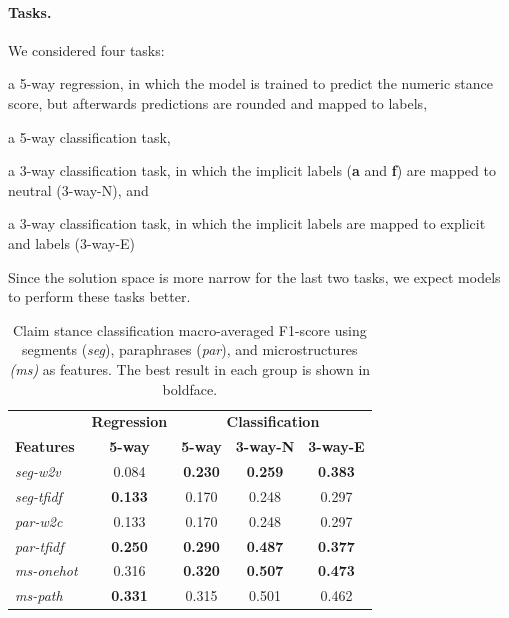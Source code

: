\paragraph{Tasks.}
We considered four tasks:
\begin{enumerate*}[label=(\arabic*)]
\item a 5-way regression, in which the model is trained to predict the
numeric stance score, but afterwards predictions are rounded and mapped to labels,
\item a 5-way classification task,
\item a 3-way classification task, in which the implicit labels (\textbf{a} and \textbf{f}) are
mapped to neutral (3-way-N), and
\item a 3-way classification task, in which the implicit labels are mapped to
explicit  and  labels (3-way-E)
\end{enumerate*}
Since the solution space is more narrow for the last two tasks, 
we expect models to perform these tasks better. 


\begin{table}[t]
\begin{center}
{
\setlength{\tabcolsep}{5pt}
\begin{tabular}{l cccc}
\toprule
& \textbf{Regression} & \multicolumn{3}{c}{\textbf{Classification}}\\
\cmidrule(lr){2-2}\cmidrule(lr){3-5}
\textbf{Features} & \textbf{5-way} & \textbf{5-way} & \textbf{3-way-N} & \textbf{3-way-E} \\
\midrule
\emph{seg-w2v}    &      0.084  &      \textbf{0.230} &             \textbf{0.259}                     &   \textbf{0.383} \\
\emph{seg-tfidf}      &      \textbf{0.133}  &      0.170 &             0.248                     &   0.297 \\
\midrule
\emph{par-w2c}   &       0.133  &      0.170 &             0.248                     &   0.297 \\
\emph{par-tfidf} &       \textbf{0.250}  &      \textbf{0.290} &             \textbf{0.487}                     &   \textbf{0.377} \\
\midrule
\emph{ms-onehot} &       0.316  &     	\textbf{0.320} & 	\textbf{0.507}                    &   \textbf{0.473} \\
\emph{ms-path}  &  \textbf{0.331}  &     	0.315 &         	0.501                    &    0.462 \\
\bottomrule
\end{tabular}}
\caption{Claim stance classification macro-averaged F1-score using segments
	(\emph{seg}), paraphrases (\emph{par}), and microstructures \emph{(ms)}
	as features. The best result in each group is shown in boldface.}
\label{tab:microstructure_stance_experiment}
\end{center}
\end{table}

